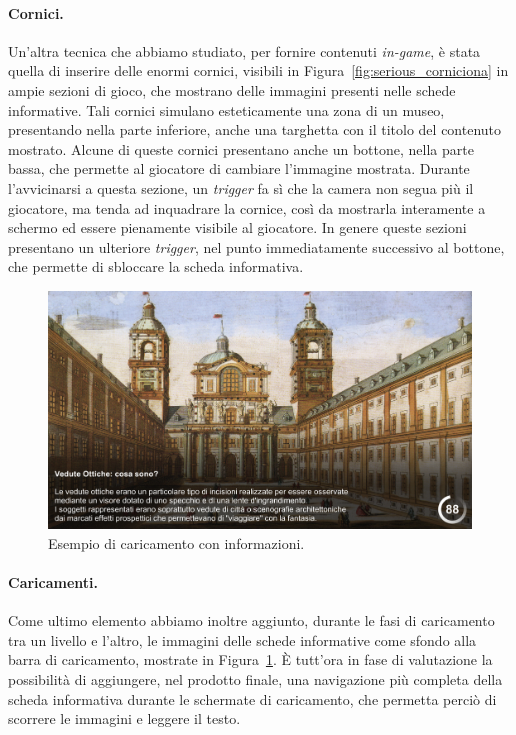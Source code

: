 \paragraph{Cornici.}
\label{Cornicione}
Un’altra tecnica che abbiamo studiato, per fornire contenuti \textit{in-game}, è stata quella di inserire delle enormi cornici, visibili in Figura~\ref{fig:serious_corniciona} in ampie sezioni di gioco, che mostrano delle immagini presenti nelle schede informative. Tali cornici simulano esteticamente una zona di un museo, presentando nella parte inferiore, anche una targhetta con il titolo del contenuto mostrato.
Alcune di queste cornici presentano anche un bottone, nella parte bassa, che permette al giocatore di cambiare l’immagine mostrata.
Durante l’avvicinarsi a questa sezione, un \textit{trigger} fa sì che la camera non segua più il giocatore, ma tenda ad inquadrare la cornice, così da mostrarla interamente a schermo ed essere pienamente visibile al giocatore.
In genere queste sezioni presentano un ulteriore \textit{trigger}, nel punto immediatamente successivo al bottone, che permette di sbloccare la scheda informativa.

\begin{figure}%
	\centering
	\includegraphics[width= 0.9\columnwidth]{images/gameDesign/55_caricamenti.jpg}
	\caption{Esempio di caricamento con informazioni.}
	\label{fig:serious_caricamenti}
\end{figure}

\paragraph{Caricamenti.}
\label{caricamenti}
Come ultimo elemento abbiamo inoltre aggiunto, durante le fasi di caricamento tra un livello e l’altro, le immagini delle schede informative come sfondo alla barra di caricamento, mostrate in Figura~\ref{fig:serious_caricamenti}.
È tutt’ora in fase di valutazione la possibilità di aggiungere, nel prodotto finale, una navigazione più completa della scheda informativa durante le schermate di caricamento, che permetta perciò di scorrere le immagini e leggere il testo.

